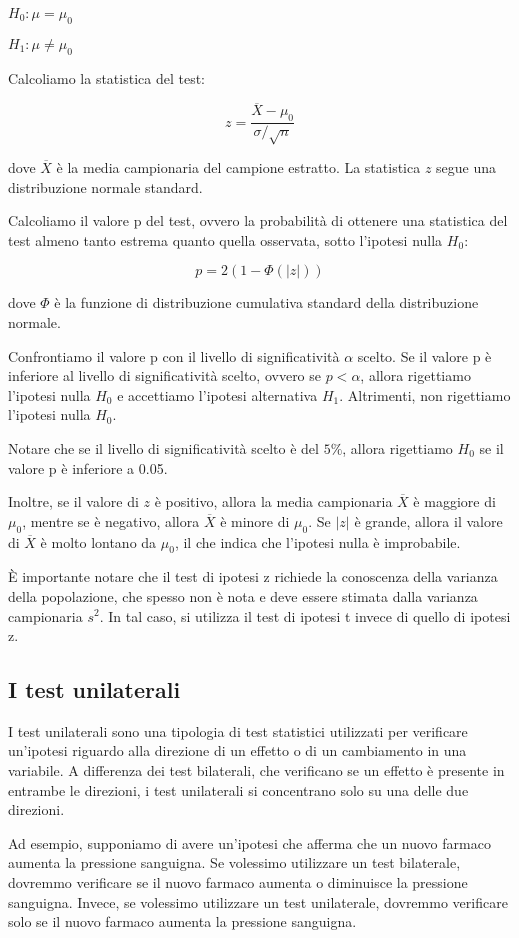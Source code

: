 $H_0: \mu = \mu_0$ 

$H_1: \mu \neq \mu_0$ 

Calcoliamo la statistica del test:

$$z = \frac{\overline{X} - \mu_0}{\sigma / \sqrt{n}}$$

dove $\overline{X}$ è la media campionaria del campione estratto. La statistica $z$ segue una distribuzione normale standard.

Calcoliamo il valore p del test, ovvero la probabilità di ottenere una statistica del test almeno tanto estrema quanto quella osservata, sotto l'ipotesi nulla $H_0$:

$$p = 2(1 - \Phi(|z|))$$

dove $\Phi$ è la funzione di distribuzione cumulativa standard della distribuzione normale.

Confrontiamo il valore p con il livello di significatività $\alpha$ scelto. Se il valore p è inferiore al livello di significatività scelto, ovvero se $p < \alpha$, allora rigettiamo l'ipotesi nulla $H_0$ e accettiamo l'ipotesi alternativa $H_1$. Altrimenti, non rigettiamo l'ipotesi nulla $H_0$.

Notare che se il livello di significatività scelto è del $5\%$, allora rigettiamo $H_0$ se il valore p è inferiore a 0.05. 

Inoltre, se il valore di $z$ è positivo, allora la media campionaria $\overline{X}$ è maggiore di $\mu_0$, mentre se è negativo, allora $\overline{X}$ è minore di $\mu_0$. Se $|z|$ è grande, allora il valore di $\overline{X}$ è molto lontano da $\mu_0$, il che indica che l'ipotesi nulla è improbabile.

È importante notare che il test di ipotesi z richiede la conoscenza della varianza della popolazione, che spesso non è nota e deve essere stimata dalla varianza campionaria $s^2$. In tal caso, si utilizza il test di ipotesi t invece di quello di ipotesi z.

\subsection{I test unilaterali}
I test unilaterali sono una tipologia di test statistici utilizzati per verificare un'ipotesi riguardo alla direzione di un effetto o di un cambiamento in una variabile. A differenza dei test bilaterali, che verificano se un effetto è presente in entrambe le direzioni, i test unilaterali si concentrano solo su una delle due direzioni. 

Ad esempio, supponiamo di avere un'ipotesi che afferma che un nuovo farmaco aumenta la pressione sanguigna. Se volessimo utilizzare un test bilaterale, dovremmo verificare se il nuovo farmaco aumenta o diminuisce la pressione sanguigna. Invece, se volessimo utilizzare un test unilaterale, dovremmo verificare solo se il nuovo farmaco aumenta la pressione sanguigna.

